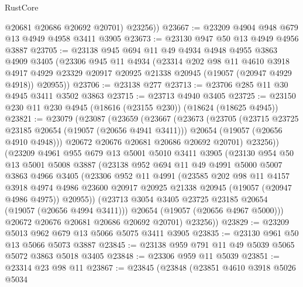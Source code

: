 \begin{lexlean}{RustCore}
\begin{coremodule}
          @20681
          @20686
          @20692
          @20701)
        @23256))
@23667 := @23209 @4904 @948 @679 @13 @4949 @4958 @3411 @3905
@23673 := @23130 @947 @50 @13 @4949 @4956 @3887
@23705 := @23138
    @945
    @694
    @11
    @49
    @4934
    @4948
    @4955
    @3863
    @4909
    @3405
    (@23306
      @945
      @11
      @4934
      (@23314
        @202
        @98
        @11
        @4610
        @3918
        @4917
        @4929
        @23329
        @20917
        @20925
        @21338
        @20945
        (@19057 (@20947 @4929 @4918))
        @20955))
@23706 := @23138 @277
@23713 := @23706 @285 @11 @30 @4945 @3411 @3502 @3863
@23715 := @23713 @4940 @3405
@23725 := @23150 @230 @11 @230 @4945 (@18616 (@23155 @230)) (@18624 (@18625 @4945))
@23821 := @23079
    (@23087
      (@23659
        (@23667
          (@23673
            (@23705
              (@23715 @23725 @23185 @20654 (@19057 (@20656 @4941 @3411)))
              @20654
              (@19057 (@20656 @4910 @4948)))
            @20672
            @20676
            @20681
            @20686
            @20692
            @20701)
          @23256))
      (@23209
        @4961
        @955
        @679
        @13
        @5001
        @5010
        @3411
        @3905
        (@23130
          @954
          @50
          @13
          @5001
          @5008
          @3887
          (@23138
            @952
            @694
            @11
            @49
            @4991
            @5000
            @5007
            @3863
            @4966
            @3405
            (@23306
              @952
              @11
              @4991
              (@23585
                @202
                @98
                @11
                @4157
                @3918
                @4974
                @4986
                @23600
                @20917
                @20925
                @21338
                @20945
                (@19057 (@20947 @4986 @4975))
                @20955))
            (@23713 @3054 @3405 @23725 @23185 @20654 (@19057 (@20656 @4994 @3411)))
            @20654
            (@19057 (@20656 @4967 @5000)))
          @20672
          @20676
          @20681
          @20686
          @20692
          @20701)
        @23256))
@23829 := @23209 @5013 @962 @679 @13 @5066 @5075 @3411 @3905
@23835 := @23130 @961 @50 @13 @5066 @5073 @3887
@23845 := @23138 @959 @791 @11 @49 @5039 @5065 @5072 @3863 @5018 @3405
@23848 := @23306 @959 @11 @5039
@23851 := @23314 @23 @98 @11
@23867 := @23845
    (@23848
      (@23851
        @4610
        @3918
        @5026
        @5034

\end{coremodule}
\end{lexlean}
